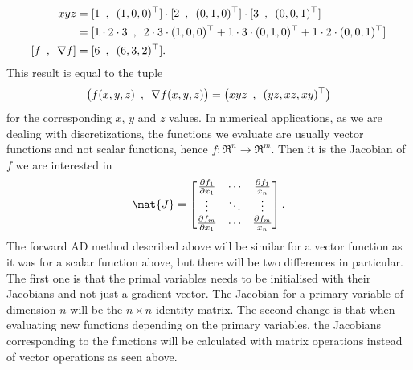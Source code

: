 \begin{align*}
    xyz &= [1\hspace{0.5em},\hspace{0.5em}(1,0,0)^\top]\cdot [2\hspace{0.5em},\hspace{0.5em}(0,1,0)^\top]\cdot
    [3\hspace{0.5em},\hspace{0.5em}(0,0,1)^\top] \\
    &=[1\cdot 2\cdot 3\hspace{0.5em},\hspace{0.5em}2\cdot3\cdot(1,0,0)^\top + 1\cdot3\cdot(0,1,0)^\top + 1\cdot2\cdot(0,0,1)^\top] \\
    [f\hspace{0.5em},\hspace{0.5em}\nabla f] &= [6\hspace{0.5em},\hspace{0.5em}(6,3,2)^\top].
\end{align*}
This result is equal to the tuple
\begin{equation*}
    \big(f(x,y,z) \hspace{0.5em},\hspace{0.5em} \nabla f(x,y,z)\big) = \big(xyz \hspace{0.5em},\hspace{0.5em} (yz,xz,xy)^\top\big)
\end{equation*}
for the corresponding $x$, $y$ and $z$ values. In numerical applications, as we are dealing with discretizations, the functions we evaluate are usually  vector functions and not scalar functions, hence $f: \Re^n \rightarrow \Re^m$. Then it is the Jacobian of $f$ we are interested in
\begin{align*}
    \mat{J}  =
    \begin{bmatrix}
        \frac{\partial f_1}{\partial x_1} & \dotsb & \frac{\partial f_1}{x_n}\\
        \vdots & \ddots & \vdots \\
        \frac{\partial f_m}{\partial x_1} & \dotsb & \frac{\partial f_m}{x_n}
    \end{bmatrix}.
\end{align*}
The forward AD method described above will be similar for a vector function as it was for a scalar function above, but there will be two differences in particular. The first one is that the primal variables needs to be initialised with their Jacobians and not just a gradient vector. The Jacobian for a primary variable of dimension $n$ will be the $n \times n$ identity matrix. The second change is that when evaluating new functions depending on the primary variables, the Jacobians corresponding to the functions will be calculated with matrix operations instead of vector operations as seen above. 

